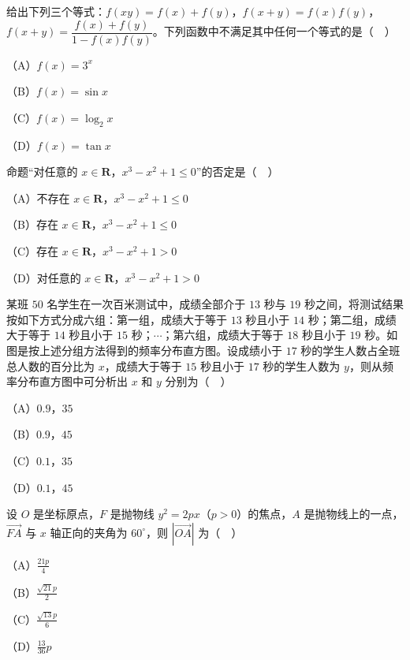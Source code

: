 \begin{question}
给出下列三个等式：$f(xy)=f(x)+f(y)$，$f(x+y)=f(x)f(y)$，$f(x+y)=\dfrac{f(x)+f(y)}{1-f(x)f(y)}$。下列函数中不满足其中任何一个等式的是（　）

（A）$f(x)=3^x$

（B）$f(x)=\sin x$

（C）$f(x)=\log_2 x$

（D）$f(x)=\tan x$

\end{question}
\begin{question}
命题“对任意的 $x\in\mathbf R$，$x^3-x^2+1\leqslant0$”的否定是（　）

（A）不存在 $x\in\mathbf R$，$x^3-x^2+1\leqslant0$

（B）存在 $x\in\mathbf R$，$x^3-x^2+1\leqslant0$

（C）存在 $x\in\mathbf R$，$x^3-x^2+1>0$

（D）对任意的 $x\in\mathbf R$，$x^3-x^2+1>0$

\Needspace{0.4\textheight}
\end{question}
\begingroup
\renewenvironment{question}{\Needspace{0.5\textheight}}{}
\begin{question}
某班 $50$ 名学生在一次百米测试中，成绩全部介于 $13$ 秒与 $19$ 秒之间，将测试结果按如下方式分成六组：第一组，成绩大于等于 $13$ 秒且小于 $14$ 秒；第二组，成绩大于等于 $14$ 秒且小于 $15$ 秒；$\cdots$；第六组，成绩大于等于 $18$ 秒且小于 $19$ 秒。如图是按上述分组方法得到的频率分布直方图。设成绩小于 $17$ 秒的学生人数占全班总人数的百分比为 $x$，成绩大于等于 $15$ 秒且小于 $17$ 秒的学生人数为 $y$，则从频率分布直方图中可分析出 $x$ 和 $y$ 分别为（　）
\nopagebreak[4]
\begin{center}\end{center}
\nopagebreak[4]
（A）$0.9$，$35$

（B）$0.9$，$45$

（C）$0.1$，$35$

（D）$0.1$，$45$

\end{question}
\endgroup
\begin{question}
设 $O$ 是坐标原点，$F$ 是抛物线 $y^2=2px$（$p>0$）的焦点，$A$ 是抛物线上的一点，$\overrightarrow{FA}$ 与 $x$ 轴正向的夹角为 $60^\circ$，则 $\left|\overrightarrow{OA}\right|$ 为（　）

（A）$\frac{21p}{4}$

（B）$\frac{\sqrt{21}p}{2}$

（C）$\frac{\sqrt{13}p}{6}$

（D）$\frac{13}{36}p$

\Needspace{0.4\textheight}
\end{question}
